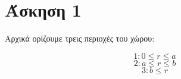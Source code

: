 \section{Άσκηση 1}

Αρχικά ορίζουμε τρεις περιοχές του χώρου:

\[ 1: 0 \leq r \leq a \]
\[ 2: a \leq r \leq b \]
\[ 3: b \leq r \]




% 
% 
% 
% 
% 
% 
